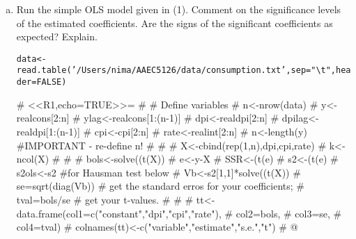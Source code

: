 \documentclass[11pt,reqno]{amsart}\usepackage[]{graphicx}\usepackage[]{color}
\makeatletter
\newcommand{\hlnum}[1]{\textcolor[rgb]{0.063,0.58,0.627}{#1}}%
\newcommand{\hlstr}[1]{\textcolor[rgb]{0.063,0.58,0.627}{#1}}%
\newcommand{\hlstd}[1]{\textcolor[rgb]{0.196,0.196,0.196}{#1}}%
\newcommand{\hlkwb}[1]{\textcolor[rgb]{0.627,0,0.314}{#1}}%
\newcommand{\hlkwc}[1]{\textcolor[rgb]{0,0.631,0.314}{#1}}%
\newcommand{\hlkwd}[1]{\textcolor[rgb]{0.78,0.227,0.412}{#1}}%
\newenvironment{kframe}{%
 \def\at@end@of@kframe{}%
 \ifinner\ifhmode%
  \def\at@end@of@kframe{\end{minipage}}%
  \begin{minipage}{\columnwidth}%
 \fi\fi%
 \def\FrameCommand##1{\hskip\@totalleftmargin \hskip-\fboxsep
 \colorbox{shadecolor}{##1}\hskip-\fboxsep
     \hskip-\linewidth \hskip-\@totalleftmargin \hskip\columnwidth}%
 \MakeFramed {\advance\hsize-\width
   \@totalleftmargin\z@ \linewidth\hsize
   \@setminipage}}%
 {\par\unskip\endMakeFramed%
 \at@end@of@kframe}
\newenvironment{knitrout}{}{} %
\makeatother
\begin{document}
\begin{enumerate}[(a)]
\item Run the simple OLS model given in (1). Comment on the significance levels of the estimated coefficients. Are the signs of the significant coefficients as expected? Explain.

\begin{knitrout}
\color{fgcolor}\begin{kframe}
\begin{alltt}
\hlstd{data}\hlkwb{<-} \hlkwd{read.table}\hlstd{(}\hlstr{'/Users/nima/AAEC5126/data/consumption.txt'}\hlstd{,} \hlkwc{sep}\hlstd{=}\hlstr{"\textbackslash{}t"}\hlstd{,} \hlkwc{header}\hlstd{=}\hlnum{FALSE}\hlstd{)}
\end{alltt}
\end{kframe}
\end{knitrout}

# <<R1,echo=TRUE>>=
# # Define variables
# n<-nrow(data) 
# y<-realcons[2:n]
# ylag<-realcons[1:(n-1)]
# dpi<-realdpi[2:n]
# dpilag<-realdpi[1:(n-1)]
# cpi<-cpi[2:n]
# rate<-realint[2:n]
# n<-length(y)  #IMPORTANT - re-define n!
# #
# X<-cbind(rep(1,n),dpi,cpi,rate)
# k<-ncol(X)
# #
# bols<-solve((t(X)) %
# e<-y-X%
# SSR<-(t(e)%
# s2<-(t(e)%
# s2ols<-s2 #for Hausman test below
# Vb<-s2[1,1]*solve((t(X))%
# se=sqrt(diag(Vb)) # get the standard erros for your coefficients;
# tval=bols/se # get your t-values.
# #
# tt<-data.frame(col1=c("constant","dpi","cpi","rate"),
#                 col2=bols,
#                 col3=se,
#                 col4=tval)
# colnames(tt)<-c("variable","estimate","s.e.","t")
# @

\end{enumerate}
\end{document}
